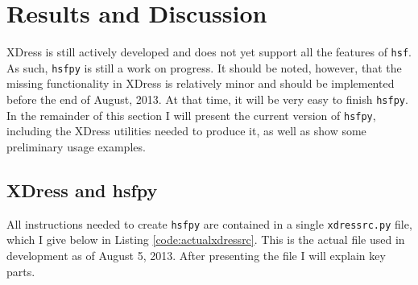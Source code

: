 
\section{Results and Discussion} \label{sec:results_and_discussion}

XDress is still actively developed and does not yet support all the features of \texttt{hsf}. As such, \texttt{hsfpy} is still a work on progress. It should be noted, however, that the missing functionality in XDress is relatively minor and should be implemented before the end of August, 2013. At that time, it will be very easy to finish \texttt{hsfpy}. In the remainder of this section I will present the current version of \texttt{hsfpy}, including the XDress utilities needed to produce it, as well as show some preliminary usage examples.

\subsection{XDress and hsfpy} \label{sub:xdress_and_hsfpy}

  All instructions needed to create \texttt{hsfpy} are contained in a single \texttt{xdressrc.py} file, which I give below in Listing \ref{code:actualxdressrc}. This is the actual file used in development as of August 5, 2013. After presenting the file I will explain key parts.

  \vspace{.2in}
  

